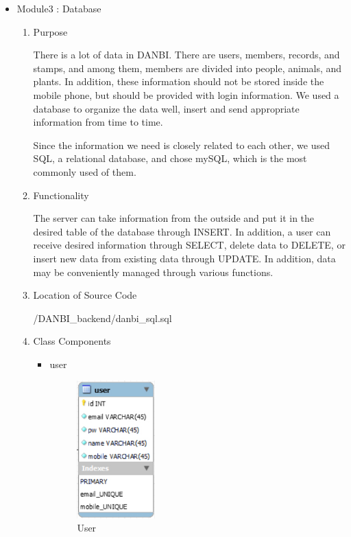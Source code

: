 \documentclass[conference]{IEEEtran}
\begin{document}
\begin{itemize}
    \item Module3 : Database
    \begin{enumerate}
    \setlength{\parindent}{2ex}
    \setlength{\parskip}{0.5em}
        \item Purpose
        
        There is a lot of data in DANBI. There are users, members, records, and stamps, and among them, members are divided into people, animals, and plants. In addition, these information should not be stored inside the mobile phone, but should be provided with login information. We used a database to organize the data well, insert and send appropriate information from time to time.

        Since the information we need is closely related to each other, we used SQL, a relational database, and chose mySQL, which is the most commonly used of them.
        \item Functionality
        
        The server can take information from the outside and put it in the desired table of the database through INSERT. In addition, a user can receive desired information through SELECT, delete data to DELETE, or insert new data from existing data through UPDATE. In addition, data may be conveniently managed through various functions.
        \item Location of Source Code
        
        /DANBI\_backend/danbi\_sql.sql
        \item Class Components
        \begin{itemize}
            \item user
            \setlength{\parindent}{2ex}
            \par \begin{figure}[h!]
            \includegraphics[width=3cm]{image/db_user.jpg}
            \centering
            \caption{User}
            \label{fig:db_user}
            \end{figure}
            

\end{itemize}
\end{enumerate}
\end{itemize}
\end{document}
